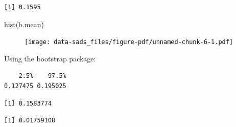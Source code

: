 \documentclass[
  letterpaper,
]{book}
\newenvironment{Shaded}{\begin{snugshade}}{\end{snugshade}}
\newcommand{\DecValTok}[1]{\textcolor[rgb]{0.68,0.00,0.00}{#1}}
\newcommand{\FunctionTok}[1]{\textcolor[rgb]{0.28,0.35,0.67}{#1}}
\newcommand{\NormalTok}[1]{\textcolor[rgb]{0.00,0.23,0.31}{#1}}
\newcommand{\OtherTok}[1]{\textcolor[rgb]{0.00,0.23,0.31}{#1}}
\newcommand{\SpecialCharTok}[1]{\textcolor[rgb]{0.37,0.37,0.37}{#1}}
\begin{document}
\begin{verbatim}
[1] 0.1595
\end{verbatim}

\begin{Shaded}
\begin{Highlighting}[]
\FunctionTok{hist}\NormalTok{(b.mean)}
\end{Highlighting}
\end{Shaded}

\begin{figure}[H]

{\centering \texttt{[image: data-sads\_files/figure-pdf/unnamed-chunk-6-1.pdf]}

}

\end{figure}

Using the bootstrap package:

\begin{Shaded}
\end{Shaded}

\begin{verbatim}
    2.5%    97.5% 
0.127475 0.195025 
\end{verbatim}

\begin{Shaded}
\end{Shaded}

\begin{verbatim}
[1] 0.1583774
\end{verbatim}

\begin{Shaded}
\end{Shaded}

\begin{verbatim}
[1] 0.01759108
\end{verbatim}
\end{document}
